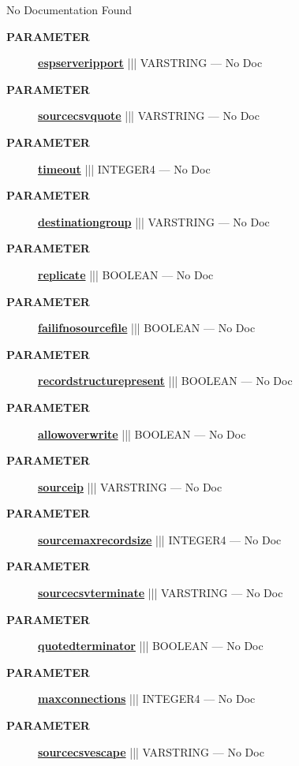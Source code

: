 No Documentation Found






\par
\begin{description}
\item [\colorbox{tagtype}{\color{white} \textbf{\textsf{PARAMETER}}}] \textbf{\underline{espserveripport}} ||| VARSTRING --- No Doc
\item [\colorbox{tagtype}{\color{white} \textbf{\textsf{PARAMETER}}}] \textbf{\underline{sourcecsvquote}} ||| VARSTRING --- No Doc
\item [\colorbox{tagtype}{\color{white} \textbf{\textsf{PARAMETER}}}] \textbf{\underline{timeout}} ||| INTEGER4 --- No Doc
\item [\colorbox{tagtype}{\color{white} \textbf{\textsf{PARAMETER}}}] \textbf{\underline{destinationgroup}} ||| VARSTRING --- No Doc
\item [\colorbox{tagtype}{\color{white} \textbf{\textsf{PARAMETER}}}] \textbf{\underline{replicate}} ||| BOOLEAN --- No Doc
\item [\colorbox{tagtype}{\color{white} \textbf{\textsf{PARAMETER}}}] \textbf{\underline{failifnosourcefile}} ||| BOOLEAN --- No Doc
\item [\colorbox{tagtype}{\color{white} \textbf{\textsf{PARAMETER}}}] \textbf{\underline{recordstructurepresent}} ||| BOOLEAN --- No Doc
\item [\colorbox{tagtype}{\color{white} \textbf{\textsf{PARAMETER}}}] \textbf{\underline{allowoverwrite}} ||| BOOLEAN --- No Doc
\item [\colorbox{tagtype}{\color{white} \textbf{\textsf{PARAMETER}}}] \textbf{\underline{sourceip}} ||| VARSTRING --- No Doc
\item [\colorbox{tagtype}{\color{white} \textbf{\textsf{PARAMETER}}}] \textbf{\underline{sourcemaxrecordsize}} ||| INTEGER4 --- No Doc
\item [\colorbox{tagtype}{\color{white} \textbf{\textsf{PARAMETER}}}] \textbf{\underline{sourcecsvterminate}} ||| VARSTRING --- No Doc
\item [\colorbox{tagtype}{\color{white} \textbf{\textsf{PARAMETER}}}] \textbf{\underline{quotedterminator}} ||| BOOLEAN --- No Doc
\item [\colorbox{tagtype}{\color{white} \textbf{\textsf{PARAMETER}}}] \textbf{\underline{maxconnections}} ||| INTEGER4 --- No Doc
\item [\colorbox{tagtype}{\color{white} \textbf{\textsf{PARAMETER}}}] \textbf{\underline{sourcecsvescape}} ||| VARSTRING --- No Doc

\end{description}
